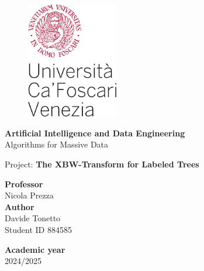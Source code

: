 \begin{titlepage}
\begin{figure}[!htb]
    \includegraphics[width=4cm]{Immagini/logo 2 unive.png}
\end{figure}

\begin{center}
    \vspace{13mm}
    \normalsize{\textbf{Artificial Intelligence and Data Engineering}}
    \vspace{13mm}
    \\ \normalsize{Algorithms for Massive Data}
\end{center}

\vspace{10mm}
\begin{center}
    \LARGE{Project: \textbf{The XBW-Transform for Labeled Trees}}
\end{center}

\vspace*{\fill}

\begin{minipage}[t]{1\textwidth}
    {\normalsize{\textbf{Professor}}{\normalsize\vspace{1mm}
    \\ \normalsize{Nicola Prezza }}} \\ 
        
    {\normalsize{\textbf{Author}}{\normalsize\vspace{1mm}
    \\ \normalsize{Davide Tonetto}\\
    \normalsize{Student ID 884585 }}} \\
\end{minipage}

\begin{flushleft}
    {\normalsize{\textbf{Academic year}}{\normalsize\vspace{1mm}
    \\ \normalsize{2024/2025}}}  
\end{flushleft}

\end{titlepage}
